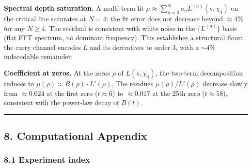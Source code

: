 \documentclass[
  11pt,
]{article}
\begin{document}
\textbf{Spectral depth saturation.} A multi-term fit
\(\mu \approx \sum_{n=0}^{N} a_n L^{(n)}(s, \chi_4)\) on the critical line
saturates at \(N = 4\): the fit error does not decrease beyond \(\approx 4\%\)
for any \(N \geq 4\). The residual is consistent with white noise in the
\(\{L^{(n)}\}\) basis (flat FFT spectrum, no dominant frequency). This
establishes a structural floor: the carry channel encodes \(L\) and its
derivatives to order 3, with a \(\sim 4\%\) indecodable remainder.

\textbf{Coefficient at zeros.} At the zeros \(\rho\) of \(L(s, \chi_4)\), the
two-term decomposition reduces to \(\mu(\rho) \approx B(\rho) \cdot L'(\rho)\).
The residues \(\mu(\rho)/L'(\rho)\) decrease slowly from \(\approx 0.024\) at
the first zero (\(t \approx 6\)) to \(\approx 0.017\) at the 25th zero
(\(t \approx 58\)), consistent with the power-law decay of \(B(t)\).

\begin{center}\rule{0.5\linewidth}{0.5pt}\end{center}

\newpage

\subsection{8. Computational Appendix}\label{computational-appendix}

\subsubsection{8.1 Experiment index}\label{experiment-index}
\end{document}
